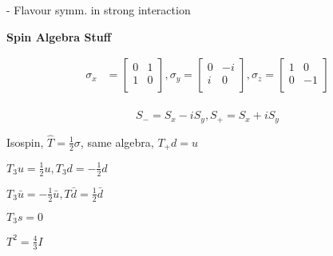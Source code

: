 \documentclass[10pt,letterpaper]{article}
\newcommand{\0}{\mathcal{O}}
\begin{document}
\begin{multicols}{3}
- Flavour symm. in strong interaction

\textbf{Spin Algebra Stuff}

\begin{align*}
    \sigma_x &= \begin{bmatrix}
        0 & 1 \\
        1 & 0 \\
    \end{bmatrix}, \sigma_y = \begin{bmatrix}
        0 & -i \\
        i & 0 \\
    \end{bmatrix},
    \sigma_z = \begin{bmatrix}
        1 & 0 \\
        0 & -1 \\
    \end{bmatrix} \\
\end{align*}

$$S_- = S_x - iS_y, S_+ = S_x + iS_y$$

Isospin, $\hat{T} = \frac{1}{2}\sigma$, same algebra, $T_+d = u$

$T_3u = \frac{1}{2}u, T_3d = -\frac{1}{2}d$

$T_3\bar{u} = -\frac{1}{2}\bar{u}, T\bar{d} = \frac{1}{2}\bar{d}$

$T_3s=0$

$T^2 = \frac{4}{3}I$


\end{multicols}
\end{document}
